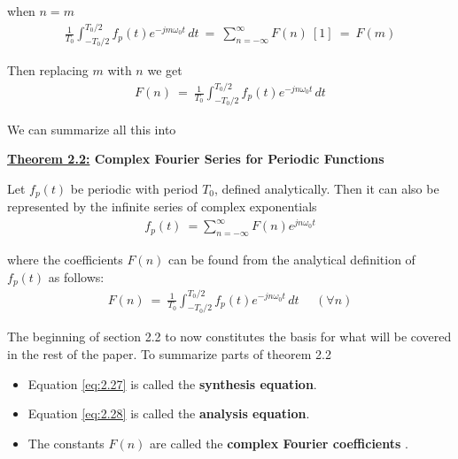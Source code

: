 \documentclass[10pt]{article}
\begin{document}
when $n = m$
\begin{equation} \label{eq:2.25}
\begin{aligned}
    \frac{1}{T_0}\int_{-T_0/2}^{T_0/2} f_p(t) e^{-jm\omega_0t} \,dt \: = \: \sum_{n=-\infty}^{\infty} F(n) \: [1] \: = \: F(m)
\end{aligned}
\end{equation}

\noindent
Then replacing $m$ with $n$ we get
\begin{equation} \label{eq:2.26}
\begin{aligned}
    F(n) \: = \: \frac{1}{T_0}\int_{-T_0/2}^{T_0/2} f_p(t) e^{-jn\omega_0t} \,dt
\end{aligned}
\end{equation}

\noindent \cite{morrison1994fourier}

\vspace{4mm}

\noindent
We can summarize all this into 

\vspace{4mm}
\noindent
\textbf{\underline{Theorem 2.2:} Complex Fourier Series for Periodic Functions}

\vspace{1mm}
Let $f_p(t)$ be periodic with period $T_0$, defined analytically. Then it can also be represented by the infinite series of complex exponentials
\begin{equation} \label{eq:2.27}
\begin{aligned}
    f_p(t) \: = \sum_{n=-\infty}^{\infty} F(n) e^{jn\omega_0t}
\end{aligned}
\end{equation}

where the coefficients $F(n)$ can be found from the analytical definition of $f_p(t)$ as follows:
\begin{equation} \label{eq:2.28}
\begin{aligned}
    F(n) \: = \: \frac{1}{T_0}\int_{-T_0/2}^{T_0/2} f_p(t) e^{-jn\omega_0t} \,dt \:\:\:\:\:\: (\forall n)
\end{aligned}
\end{equation}

The beginning of section 2.2 to now constitutes the basis for what will be covered in the rest of the paper. To summarize parts of theorem 2.2
\begin{itemize}
    \item Equation \eqref{eq:2.27} is called the \textbf{synthesis equation}.
    \item Equation \eqref{eq:2.28} is called the \textbf{analysis equation}.
    \item The constants $F(n)$ are called the \textbf{complex Fourier coefficients} \cite{morrison1994fourier}.
\end{itemize}
\end{document}
